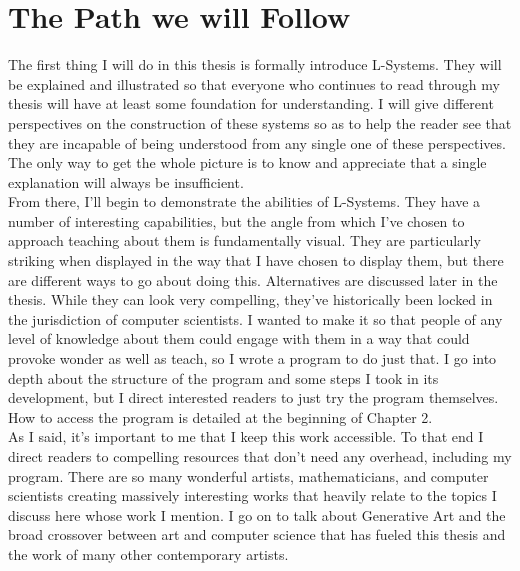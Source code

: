 \documentclass[12pt,twoside]{reedthesis}
\begin{document}
\section{The Path we will Follow}

	The first thing I will do in this thesis is formally introduce L-Systems. They will be explained and illustrated so that everyone who continues to read through my thesis will have at least some foundation for understanding. I will give different perspectives on the construction of these systems so as to help the reader see that they are incapable of being understood from any single one of these perspectives. The only way to get the whole picture is to know and appreciate that a single explanation will always be insufficient.\\
	
	From there, I'll begin to demonstrate the abilities of L-Systems. They have a number of interesting capabilities, but the angle from which I've chosen to approach teaching about them is fundamentally visual. They are particularly striking when displayed in the way that I have chosen to display them, but there are different ways to go about doing this. Alternatives are discussed later in the thesis. While they can look very compelling, they've historically been locked in the jurisdiction of computer scientists. I wanted to make it so that people of any level of knowledge about them could engage with them in a way that could provoke wonder as well as teach, so I wrote a program to do just that. I go into depth about the structure of the program and some steps I took in its development, but I direct interested readers to just try the program themselves. How to access the program is detailed at the beginning of Chapter 2.\\
	
	As I said, it's important to me that I keep this work accessible. To that end I direct readers to compelling resources that don't need any overhead, including my program. There are so many wonderful artists, mathematicians, and computer scientists creating massively interesting works that heavily relate to the topics I discuss here whose work I mention. I go on to talk about Generative Art and the broad crossover between art and computer science that has fueled this thesis and the work of many other contemporary artists.\\
	
\end{document}
